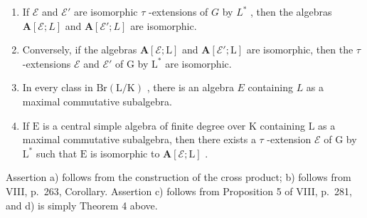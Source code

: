 \begin{enumerate}
\def\labelenumi{\alph{enumi})}
\item
  If \(\mathcal{E}\) and \(\mathcal{E}'\) are isomorphic \(\tau\) -extensions of \(G\) by \(L^*\) , then the algebras \(\mathbf{A}[\mathcal{E}; L]\) and \(\mathbf{A}[\mathcal{E}'; L]\) are isomorphic.
\item
  Conversely, if the algebras \(\mathbf{A}[\mathcal{E};\mathrm{L}]\) and \(\mathbf{A}[\mathcal{E}';\mathrm{L}]\) are isomorphic, then the \(\tau\) -extensions \(\mathcal{E}\) and \(\mathcal{E}'\) of \(\mathrm{G}\) by \(\mathrm{L}^*\) are isomorphic.
\item
  In every class in \(\mathrm{Br(L / K)}\) , there is an algebra \(E\) containing \(L\) as a maximal commutative subalgebra.
\item
  If \(\mathrm{E}\) is a central simple algebra of finite degree over \(\mathrm{K}\) containing \(\mathrm{L}\) as a maximal commutative subalgebra, then there exists a \(\tau\) -extension \(\mathcal{E}\) of \(\mathrm{G}\) by \(\mathrm{L}^*\) such that \(\mathrm{E}\) is isomorphic to \(\mathbf{A}[\mathcal{E};\mathrm{L}]\) .
\end{enumerate}

Assertion a) follows from the construction of the cross product; b) follows from VIII, p.~263, Corollary. Assertion c) follows from Proposition 5 of VIII, p.~281, and d) is simply Theorem 4 above.


